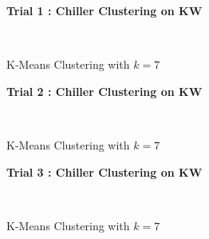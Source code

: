 \begin{figure}[!h]
\centerline{\bfseries\Large Trial 1 : Chiller Clustering on KW}\\
\caption{K-Means Clustering with $k=7$}
\end{figure}
\begin{figure}[!h]
\centerline{\bfseries\Large Trial 2 : Chiller Clustering on KW}\\
\caption{K-Means Clustering with $k=7$}
\end{figure}
\begin{figure}[!h]
\centerline{\bfseries\Large Trial 3 : Chiller Clustering on KW}\\
\caption{K-Means Clustering with $k=7$}
\end{figure}
